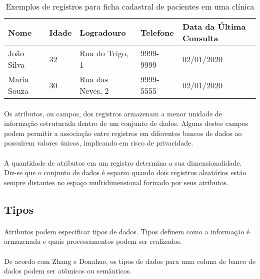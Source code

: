\begin{table}[ht]
    \caption{Exemplos de registros para ficha cadastral de pacientes em uma clínica}
    \label{table:registros}
    \begin{center}
        \begin{tabular}{| l | l | l | l | l |}
        \hline
        Nome & Idade & Logradouro & Telefone & Data da Última Consulta \\ \hline
        João Silva & 32 & Rua do Trigo, 1 & 9999-9999 & 02/01/2020 \\ \hline
        Maria Souza & 30 & Rua das Neves, 2 & 9999-5555 & 02/01/2020 \\ \hline
        \hline
        \end{tabular}
    \end{center}
\end{table}

\paragraph{} Os atributos, ou campos, dos registros armazenam a menor unidade de informação estruturada dentro de um conjunto de dados.
Alguns destes campos podem permitir a associação entre registros em diferentes bancos de dados ao possuírem valores únicos, implicando em risco de privacidade.

\paragraph{} A quantidade de atributos em um registro determina a sua dimensionalidade. Diz-se que o conjunto de dados é esparso quando dois registros aleatórios estão sempre distantes no espaço multidimensional formado por seus atributos.

\subsection{Tipos}

\paragraph{} Atributos podem especificar tipos de dados. Tipos definem como a informação é armazenada e quais processamentos podem ser realizados.

\paragraph{} De acordo com Zhang\cite{zhang2019sato} e Donahue\cite{donahue1979semantics}, os tipos de dados para uma coluna de banco de dados podem ser atômicos ou semânticos.

